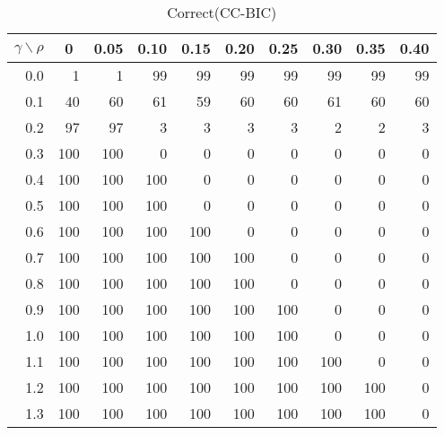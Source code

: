 \documentclass[12pt]{article}
\begin{document}
\begin{table}[!tbp]
\caption{Correct(CC-BIC)}
 \begin{center}
 \begin{tabular}{r|rrrrrrrrr}\hline\hline
\multicolumn{1}{c|}{$\gamma\backslash\rho$}&\multicolumn{1}{c}{0}&\multicolumn{1}{c}{0.05}&\multicolumn{1}{c}{0.10}&\multicolumn{1}{c}{0.15}&\multicolumn{1}{c}{0.20}&\multicolumn{1}{c}{0.25}&\multicolumn{1}{c}{0.30}&\multicolumn{1}{c}{0.35}&\multicolumn{1}{c}{0.40}\tabularnewline
\hline




0.0&  1&  1& 99& 99& 99& 99& 99& 99&99\tabularnewline
0.1& 40& 60& 61& 59& 60& 60& 61& 60&60\tabularnewline
0.2& 97& 97&  3&  3&  3&  3&  2&  2& 3\tabularnewline
0.3&100&100&  0&  0&  0&  0&  0&  0& 0\tabularnewline
0.4&100&100&100&  0&  0&  0&  0&  0& 0\tabularnewline
0.5&100&100&100&  0&  0&  0&  0&  0& 0\tabularnewline
0.6&100&100&100&100&  0&  0&  0&  0& 0\tabularnewline
0.7&100&100&100&100&100&  0&  0&  0& 0\tabularnewline
0.8&100&100&100&100&100&  0&  0&  0& 0\tabularnewline
0.9&100&100&100&100&100&100&  0&  0& 0\tabularnewline
1.0&100&100&100&100&100&100&  0&  0& 0\tabularnewline
1.1&100&100&100&100&100&100&100&  0& 0\tabularnewline
1.2&100&100&100&100&100&100&100&100& 0\tabularnewline
1.3&100&100&100&100&100&100&100&100& 0\tabularnewline
\hline
\end{tabular}

\end{center}

\end{table}

%
\end{document}
